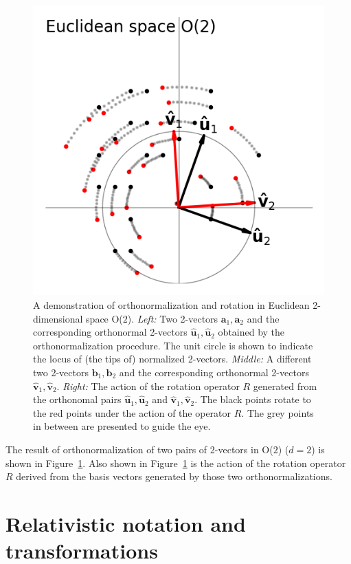 \documentclass{article}
\newcommand{\Evec}[1]{{\mathbf{#1}}} %
\newcommand{\Ehat}[1]{{\mathbf{\hat{#1}}}} %
\newcommand{\figref}[1]{Figure~\ref{#1}}
\newlength{\figurewidth}
\begin{document}
\begin{figure}[t]
\begin{mdframed}
\includegraphics[width=\figurewidth]{E_Q.png}
\caption{A demonstration of orthonormalization and rotation in Euclidean 2-dimensional space O($2$).
\textsl{Left:} Two 2-vectors $\Evec{a}_1, \Evec{a}_2$ and the corresponding orthonormal 2-vectors $\Ehat{u}_1, \Ehat{u}_2$ obtained by the orthonormalization procedure.
The unit circle is shown to indicate the locus of (the tips of) normalized 2-vectors.
\textsl{Middle:} A different two 2-vectors $\Evec{b}_1, \Evec{b}_2$ and the corresponding orthonormal 2-vectors $\Ehat{v}_1, \Ehat{v}_2$.
\textsl{Right:} The action of the rotation operator $R$ generated from the orthonomal pairs $\Ehat{u}_1, \Ehat{u}_2$ and $\Ehat{v}_1, \Ehat{v}_2$.
The black points rotate to the red points under the action of the operator $R$.
The grey points in between are presented to guide the eye.\label{fig:Euclid}}
\end{mdframed}
\end{figure}
The result of orthonormalization of two pairs of 2-vectors in O($2$) ($d=2$) is shown in \figref{fig:Euclid}.
Also shown in \figref{fig:Euclid} is the action of the rotation operator $R$ derived from the basis vectors generated by those two orthonormalizations.

\section{Relativistic notation and transformations}\label{sec:notation}
\end{document}
